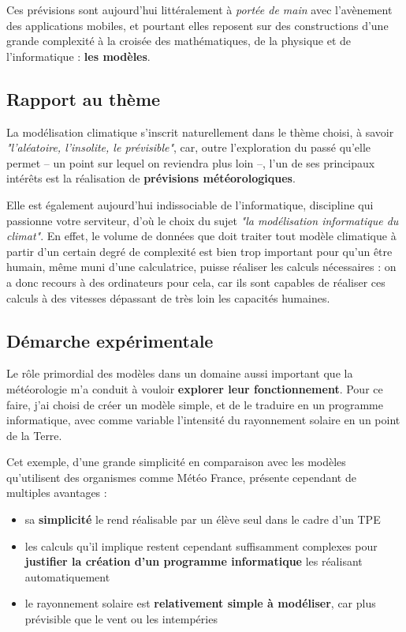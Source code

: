 \documentclass[12pt]{article}
\begin{document}
Ces prévisions sont aujourd'hui littéralement à \emph{portée de main} avec l'avènement des applications mobiles, et pourtant elles reposent sur des constructions d'une grande complexité à la croisée des mathématiques, de la physique et de l'informatique : \textbf{les modèles}.

\subsection{Rapport au thème}

La modélisation climatique s'inscrit naturellement dans le thème choisi, à savoir \emph{"l'aléatoire, l'insolite, le prévisible"}, car, outre l'exploration du passé qu'elle permet -- un point sur lequel on reviendra plus loin --, l'un de ses principaux intérêts est la réalisation de \textbf{prévisions météorologiques}.

Elle est également aujourd'hui indissociable de l'informatique, discipline qui passionne votre serviteur, d'où le choix du sujet \emph{"la modélisation informatique du climat"}.
En effet, le volume de données que doit traiter tout modèle climatique à partir d'un certain degré de complexité est bien trop important pour qu'un être humain, même muni d'une calculatrice, puisse réaliser les calculs nécessaires : on a donc recours à des ordinateurs pour cela, car ils sont capables de réaliser ces calculs à des vitesses dépassant de très loin les capacités humaines.

\subsection{Démarche expérimentale}

Le rôle primordial des modèles dans un domaine aussi important que la météorologie m'a conduit à vouloir \textbf{explorer leur fonctionnement}.
Pour ce faire, j'ai choisi de créer un modèle simple, et de le traduire en un programme informatique, avec comme variable l'intensité du rayonnement solaire en un point de la Terre.

Cet exemple, d'une grande simplicité en comparaison avec les modèles qu'utilisent des organismes comme Météo France, présente cependant de multiples avantages :

\begin{itemize}
  \item sa \textbf{simplicité} le rend réalisable par un élève seul dans le cadre d'un TPE
  \item les calculs qu'il implique restent cependant suffisamment complexes pour \textbf{justifier la création d'un programme informatique} les réalisant automatiquement
  \item le rayonnement solaire est \textbf{relativement simple à modéliser}, car plus prévisible que le vent ou les intempéries
\end{itemize}
\end{document}
